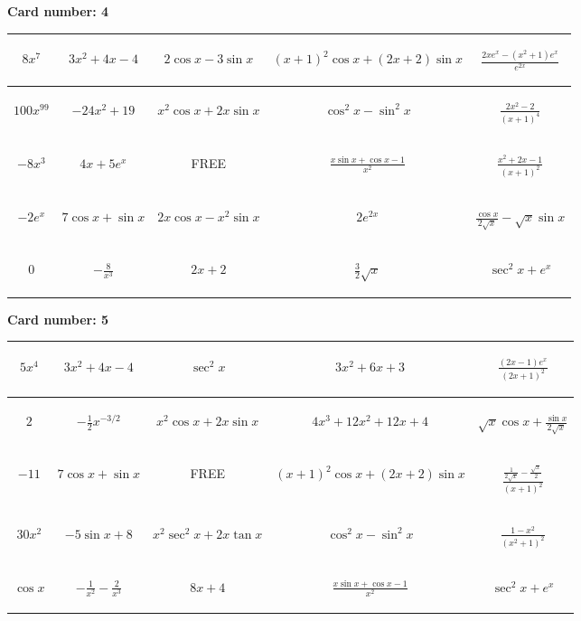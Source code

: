 \documentclass{article}
\newcommand{\entry}[1]{\begin{minipage}[t][2.75cm][t]{4cm} \vspace{1cm} \begin{center}#1\end{center} \end{minipage}}
\newcommand{\freespace}{\entry{FREE}}
\newcommand{\cardnumber}[1]{\noindent \textbf{Card number: #1} \bigskip}
\begin{document}
\pagebreak

\cardnumber{4}
\begin{center}
\begin{tabular}{|*{5}{c|}}
    \hline
    \entry{$8x^7$} & \entry{$3x^2 + 4x - 4$} & \entry{$2 \cos x - 3 \sin x$} & \entry{$(x + 1)^2 \cos x + (2x + 2) \sin x$} & \entry{$\frac{2x e^x - (x^2 + 1) e^x}{e^{2x}}$} \\ \hline
    \entry{$100x^{99}$} & \entry{$-24x^2 + 19$} & \entry{$x^2 \cos x + 2x \sin x$} & \entry{$\cos^2 x - \sin^2 x$} & \entry{$\frac{2x^2 - 2}{(x + 1)^4}$} \\ \hline
    \entry{$-8x^3$} & \entry{$4x + 5e^x$} & \freespace & \entry{$\frac{x \sin x + \cos x - 1}{x^2}$} & \entry{$\frac{x^2 + 2x - 1}{(x + 1)^2}$} \\ \hline
    \entry{$-2e^x$} & \entry{$7 \cos x + \sin x$} & \entry{$2x \cos x - x^2 \sin x$} & \entry{$2e^{2x}$} & \entry{$\frac{\cos x}{2 \sqrt{x}} - \sqrt{x} \sin x$} \\ \hline
    \entry{$0$} & \entry{$-\frac{8}{x^3}$} & \entry{$2x + 2$} & \entry{$\frac{3}{2} \sqrt{x}$} & \entry{$\sec^2 x + e^x$} \\ \hline
\end{tabular}
\end{center}

\pagebreak

\cardnumber{5}
\begin{center}
\begin{tabular}{|*{5}{c|}}
    \hline
    \entry{$5x^4$} & \entry{$3x^2 + 4x - 4$} & \entry{$\sec^2 x$} & \entry{$3x^2 + 6x + 3$} & \entry{$\frac{(2x - 1) e^x}{(2x + 1)^2}$} \\ \hline
    \entry{$2$} & \entry{$-\frac{1}{2} x^{-3/2}$} & \entry{$x^2 \cos x + 2x \sin x$} & \entry{$4x^3 + 12x^2 + 12x + 4$} & \entry{$\sqrt{x} \cos x + \frac{\sin x}{2 \sqrt{x}}$} \\ \hline
    \entry{$-11$} & \entry{$7 \cos x + \sin x$} & \freespace & \entry{$(x + 1)^2 \cos x + (2x + 2) \sin x$} & \entry{$\frac{\frac{1}{2 \sqrt{x}} - \frac{\sqrt{x}}{2}}{(x + 1)^2}$} \\ \hline
    \entry{$30x^2$} & \entry{$-5 \sin x + 8$} & \entry{$x^2 \sec^2 x + 2x \tan x$} & \entry{$\cos^2 x - \sin^2 x$} & \entry{$\frac{1 - x^2}{(x^2 + 1)^2}$} \\ \hline
    \entry{$\cos x$} & \entry{$-\frac{1}{x^2} - \frac{2}{x^3}$} & \entry{$8x + 4$} & \entry{$\frac{x \sin x + \cos x - 1}{x^2}$} & \entry{$\sec^2 x + e^x$} \\ \hline
\end{tabular}
\end{center}
\end{document}
